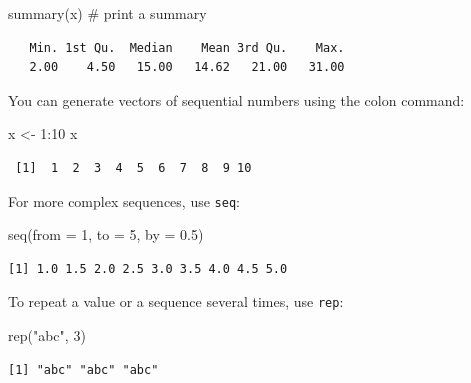 \documentclass[
  letterpaper,
  DIV=11,
  numbers=noendperiod]{scrreprt}
\newenvironment{Shaded}{\begin{snugshade}}{\end{snugshade}}
\newcommand{\AttributeTok}[1]{\textcolor[rgb]{0.40,0.45,0.13}{#1}}
\newcommand{\CommentTok}[1]{\textcolor[rgb]{0.37,0.37,0.37}{#1}}
\newcommand{\DecValTok}[1]{\textcolor[rgb]{0.68,0.00,0.00}{#1}}
\newcommand{\FloatTok}[1]{\textcolor[rgb]{0.68,0.00,0.00}{#1}}
\newcommand{\FunctionTok}[1]{\textcolor[rgb]{0.28,0.35,0.67}{#1}}
\newcommand{\NormalTok}[1]{\textcolor[rgb]{0.00,0.23,0.31}{#1}}
\newcommand{\OtherTok}[1]{\textcolor[rgb]{0.00,0.23,0.31}{#1}}
\newcommand{\SpecialCharTok}[1]{\textcolor[rgb]{0.37,0.37,0.37}{#1}}
\newcommand{\StringTok}[1]{\textcolor[rgb]{0.13,0.47,0.30}{#1}}
\begin{document}
\begin{Shaded}
\begin{Highlighting}[]
\FunctionTok{summary}\NormalTok{(x) }\CommentTok{\# print a summary}
\end{Highlighting}
\end{Shaded}

\begin{verbatim}
   Min. 1st Qu.  Median    Mean 3rd Qu.    Max. 
   2.00    4.50   15.00   14.62   21.00   31.00 
\end{verbatim}

You can generate vectors of sequential numbers using the colon command:

\begin{Shaded}
\begin{Highlighting}[]
\NormalTok{x }\OtherTok{\textless{}{-}} \DecValTok{1}\SpecialCharTok{:}\DecValTok{10}
\NormalTok{x}
\end{Highlighting}
\end{Shaded}

\begin{verbatim}
 [1]  1  2  3  4  5  6  7  8  9 10
\end{verbatim}

For more complex sequences, use \texttt{seq}:

\begin{Shaded}
\begin{Highlighting}[]
\FunctionTok{seq}\NormalTok{(}\AttributeTok{from =} \DecValTok{1}\NormalTok{, }\AttributeTok{to =} \DecValTok{5}\NormalTok{, }\AttributeTok{by =} \FloatTok{0.5}\NormalTok{)}
\end{Highlighting}
\end{Shaded}

\begin{verbatim}
[1] 1.0 1.5 2.0 2.5 3.0 3.5 4.0 4.5 5.0
\end{verbatim}

To repeat a value or a sequence several times, use \texttt{rep}:

\begin{Shaded}
\begin{Highlighting}[]
\FunctionTok{rep}\NormalTok{(}\StringTok{"abc"}\NormalTok{, }\DecValTok{3}\NormalTok{)}
\end{Highlighting}
\end{Shaded}

\begin{verbatim}
[1] "abc" "abc" "abc"
\end{verbatim}
\end{document}
